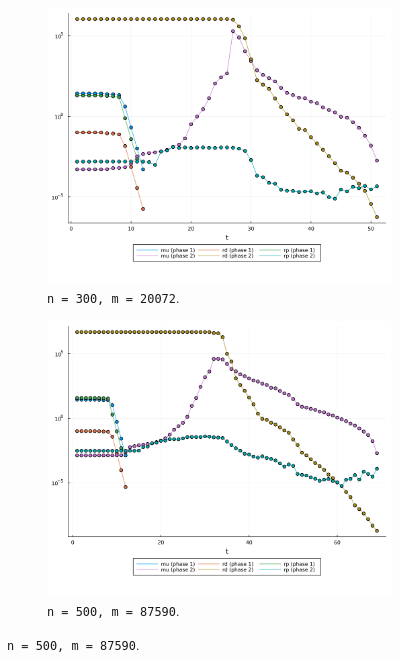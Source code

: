 \documentclass[10pt,a4paper]{article}
\begin{document}
\begin{figure}
\begin{subfigure}[b]{0.49\textwidth}
\includegraphics[width=\textwidth]{plots/ng_300_20072_51_84_41.dimacs.log.png}
\caption{\texttt{n = 300, m = 20072}.}
\end{subfigure}
\hfill
\begin{subfigure}[b]{0.49\textwidth}
\includegraphics[width=\textwidth]{plots/ng_500_87590_60_43_48.dimacs.log.png}
\caption{\texttt{n = 500, m = 87590}.}
\end{subfigure}


\end{figure}
\end{document}
